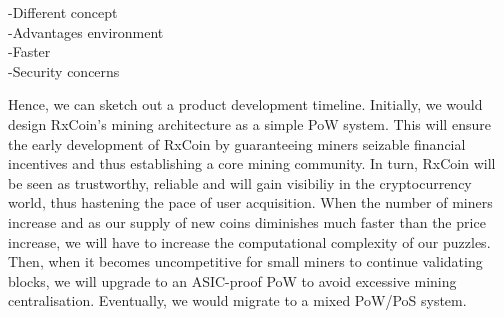 -Different concept \\
-Advantages environment \\
-Faster \\
-Security concerns 


Hence, we can sketch out a product development timeline. Initially, we would design RxCoin's mining architecture as a simple PoW system. This will ensure the early development of RxCoin by guaranteeing miners seizable financial incentives and thus establishing a core mining community. In turn, RxCoin will be seen as trustworthy, reliable and will gain visibiliy in the cryptocurrency world, thus hastening the pace of user acquisition. When the number of miners increase and as our supply of new coins diminishes much faster than the price increase, we will have to increase the computational complexity of our puzzles. Then, when it becomes uncompetitive for small miners to continue validating blocks, we will upgrade to an ASIC-proof PoW to avoid excessive mining centralisation. Eventually, we would migrate to a mixed PoW/PoS system.
